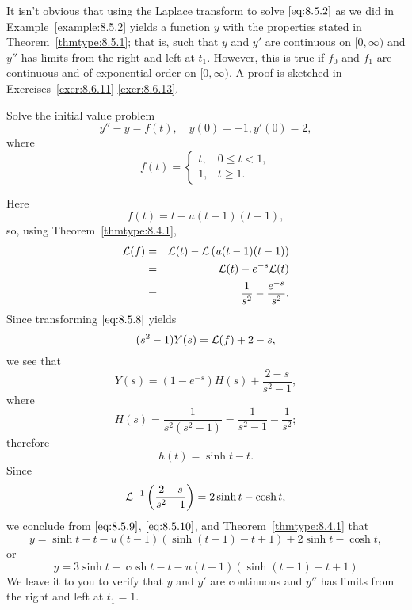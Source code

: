 \documentclass{ximera}
\begin{document}
\begin{remark}
It isn't obvious that using the Laplace transform to solve
$\eqref{eq:8.5.2}$ as we did in Example~\ref{example:8.5.2} yields a function
$y$ with the properties stated in Theorem~\ref{thmtype:8.5.1}; that is,
such that $y$ and $y'$ are continuous on $[0,\infty)$ and $y''$ has
limits from the right and left at $t_1$. However, this is true if  $f_0$ and $f_1$ are continuous and of exponential order on $[0,\infty)$. 
A proof  is sketched in Exercises~\ref{exer:8.6.11}-\ref{exer:8.6.13}.
\end{remark}

\begin{example}\label{example:8.5.3}
Solve the initial value problem
\begin{equation}\label{eq:8.5.8}
y''-y=f(t), \quad   y(0)=-1,  y'(0)=2,
\end{equation}
where
$$
f(t)=\left\{\begin{array}{cl}
t,&0\leq t<1,\\
1,&t\geq 1.
\end{array}\right.
$$
\begin{explanation}
Here
$$
f(t)=t-u(t-1)(t-1),
$$
so, using Theorem~\ref{thmtype:8.4.1},
\begin{eqnarray*}
{\cal L}(f)&=&{\cal L}(t)-{\cal L}\left(u(t-1)(t-1)\right)\\
&=&{\cal L}(t)-e^{-s}{\cal L}(t)\\
&=&\frac{1}{s^2}-\frac{e^{-s}}{s^2}.
\end{eqnarray*}
Since transforming  $\eqref{eq:8.5.8}$ yields
$$
(s^2-1) Y(s)={\cal L}(f)+2-s,
$$
we see that
\begin{equation}\label{eq:8.5.9}
Y(s)=(1-e^{-s})H(s)+\frac{2-s}{s^2-1},
\end{equation}
where
$$
H(s)=\frac{1}{s^2(s^2-1)}=\frac{1}{s^2-1}-\frac{1}{s^2};
$$
 therefore
\begin{equation}\label{eq:8.5.10}
h(t)=\sinh t-t.
\end{equation}
Since
$$
{\cal L}^{-1}\left(\frac{2-s}{s^2-1}\right)=2\sinh t-\cosh t,
$$
we conclude from  $\eqref{eq:8.5.9}$,  $\eqref{eq:8.5.10}$, and
Theorem~\ref{thmtype:8.4.1} that
$$
y=\sinh t-t-u(t-1)\left(\sinh (t-1)-t+1\right)+2\sinh t-
\cosh t,
$$
or
\begin{equation}\label{eq:8.5.11}
y=3\sinh t-\cosh t-t-u(t-1)\left(\sinh (t-1)-t+1\right)
\end{equation}
We leave it to you to verify that $y$  and $y'$ are continuous and
$y''$ has limits from the right and left at
$t_1=1$.
\end{explanation}
\end{example}
\end{document}
